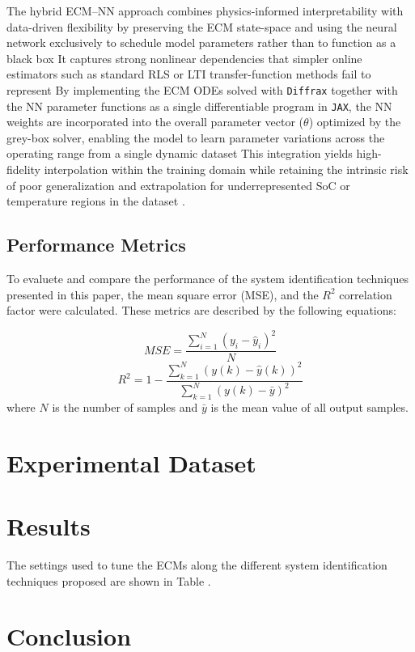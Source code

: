 \documentclass[lettersize,journal]{IEEEtran}
\begin{document}
The hybrid ECM–NN approach combines physics-informed interpretability with data-driven flexibility by preserving the ECM state-space and using the neural network exclusively to schedule model parameters rather than to function as a black box \cite{takyi2023narx, xia2024hybrid} It captures strong nonlinear dependencies that simpler online estimators such as standard RLS or LTI transfer-function methods fail to represent \cite{tran2021comprehensive, pai2023online} By implementing the ECM ODEs solved with \texttt{Diffrax} together with the NN parameter functions as a single differentiable program in \texttt{JAX}, the NN weights are incorporated into the overall parameter vector ($\theta$) optimized by the grey-box solver, enabling the model to learn parameter variations across the operating range from a single dynamic dataset This integration yields high-fidelity interpolation within the training domain while retaining the intrinsic risk of poor generalization and extrapolation for underrepresented SoC or temperature regions in the dataset \cite{valizadeh2024machine, kawahara2023battery}.

\subsection{Performance Metrics}

To evaluete and compare the performance of the system identification techniques presented in this paper, the mean square error (MSE), and the $R^2$ correlation factor were calculated. These metrics are described by the following equations:

\begin{equation}
	MSE = \frac{\sum_{i=1}^{N}(y_i-\hat{y}_i)^2}{N}
\end{equation}
\begin{equation}
	R^2 = 1-\frac{\sum_{k=1}^N(y(k)-\hat{y}(k))^2}{\sum_{k=1}^N(y(k)-\bar{y})^2}
\end{equation}
where $N$ is the number of samples and $\bar{y}$ is the mean value of all output samples.


\section{Experimental Dataset}

\section{Results}

The settings used to tune the ECMs along the different system identification techniques proposed are shown in Table .



\section{Conclusion}



\end{document}
